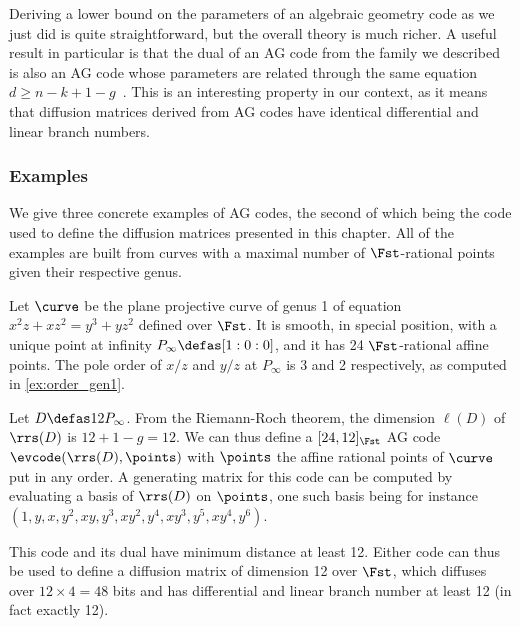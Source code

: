 Deriving a lower bound on the parameters of an algebraic geometry code as we just did is quite straightforward, but the overall theory is much richer.
A useful result in particular is that the dual of an AG code from the family we described
is also an AG code whose parameters are related through the same equation $d \geq n - k + 1 - g$~\cite[Chapter 4]{tvn}.
This is an interesting property in our context, as it means that diffusion matrices derived from AG codes have identical differential and linear branch
numbers.


\subsubsection{Examples}

We give three concrete examples of AG codes, the second of which being the code used to define the diffusion matrices presented in this chapter.
All of the examples are built from curves with a maximal number of $\Fst$-rational points given their respective genus.

\begin{example}
\label{ex:genus1}
Let $\curve$ be the plane projective curve of genus 1 of equation $x^2z + xz^2 = y^3 + yz^2$ defined over $\Fst$. It is smooth, in special position,
with a unique point at infinity $P_\infty \defas [1:0:0]$, and it has 24 $\Fst$-rational affine points. The pole order
of $x/z$ and $y/z$ at $P_\infty$ is 3 and 2 respectively, as computed in \autoref{ex:order_gen1}.

Let $D \defas 12P_\infty$. From the Riemann-Roch theorem, the dimension $\ell(D)$ of $\rrs(D)$ is $12 + 1 - g = 12$.
We can thus
define a $[24, 12]_{\Fst}$ AG code $\evcode(\rrs(D), \points)$ with $\points$ the affine rational points of $\curve$
put in any order.
A generating matrix for this code can be computed by evaluating a basis of $\rrs(D)$ on $\points$, one such basis
being for instance $(1,y,x,y^2,xy,y^3,xy^2,y^4,xy^3,y^5,xy^4,y^6)$.

This code and its dual have minimum distance at least 12.
Either code can thus be used to define a diffusion matrix of dimension 12 over $\Fst$, which diffuses over $12\times 4 = 48$ bits and
has differential and linear branch number at least 12 (in fact exactly 12).
\end{example}

